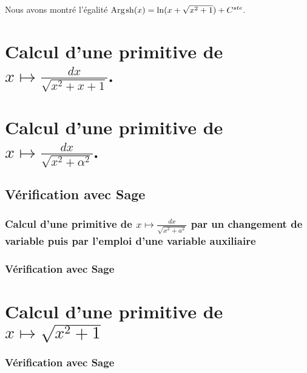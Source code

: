 \documentclass[a4paper,landscape,17pt]{extreport} %
\renewcommand{\sinh}{\mathop{\mathrm{sh}}}
\renewcommand{\arg}{\mathop{\mathrm{Arg}}}
\begin{document}
Nous avons montré l'égalité $\arg\mspace{-1mu}\sinh\nolimits(x) = \ln(x + \sqrt{x^2+1}) + C^{ste} $.



\section{Calcul d'une primitive de $  x \longmapsto  \frac{dx}{\sqrt{x^2+ x + 1} } $. }

\section{Calcul d'une primitive de $  x \longmapsto  \frac{dx}{\sqrt{x^2+ \alpha^2} } $. }

\subsection{Vérification avec Sage}



\subsubsection{Calcul d'une primitive de $  x \longmapsto  \frac{dx}{\sqrt{x^2+ a^2} } $ par un changement de variable puis par l'emploi d'une variable auxiliaire} 

\subsubsection{Vérification avec Sage}

\section{Calcul d'une primitive de $  x \longmapsto  \sqrt{x^2 + 1}  $ \label{sqrt-001} }

\subsubsection{Vérification avec Sage}
\end{document}
